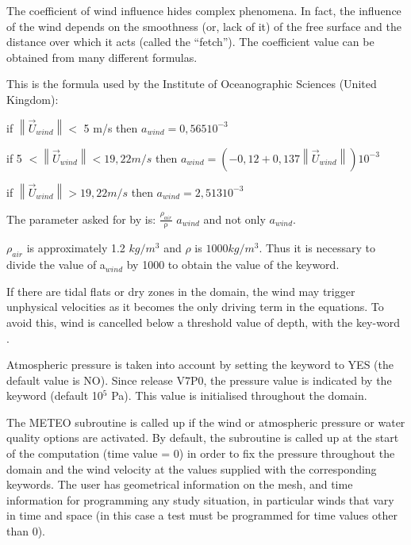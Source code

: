  The coefficient of wind influence hides complex phenomena. In fact, the influence of the wind depends on the smoothness (or, lack of it) of the free surface and the distance over which it acts (called the ``fetch''). The coefficient value can be obtained from many different formulas.

 This is the formula used by the Institute of Oceanographic Sciences (United Kingdom):



 if    $\left \|\vec{U}_{wind} \right \| <$ 5 m/s   then   $a_{wind}  = 0,565 10^{-3}$

 if  5   $< \left \| \vec{U}_{wind}  \right \| < 19,22 m/s$ then    $a_{wind} = (- 0,12 + 0,137 \left \| \vec{U}_{wind}   \right \|) 10^{-3}$

 if    $\left \| \vec{U}_{wind}  \right \|   > 19,22 m/s $  then     $a_{wind} = 2,513 10^{-3}$

 The parameter  asked for by  is: $\frac{{\rho }_{air}}{\mathrm{\rho }}$ $a_{wind}$ and not only $a_{wind}$.

 $\rho_{air}$ is approximately 1.2 $kg/m^3$ and $\rho$ is $1000 kg/m^3$. Thus it is necessary to divide the value of a${}_{wind}$ by 1000 to obtain the value of the  keyword.

 If there are tidal flats or dry zones in the domain, the wind may trigger unphysical velocities as it becomes the only driving term in the equations. To avoid this, wind is cancelled below a threshold value of depth, with the key-word .

 Atmospheric pressure is taken into account by setting the keyword  to YES (the default value is NO). Since release V7P0, the pressure value is indicated by the keyword  (default 10${}^{5}$ Pa). This value is initialised throughout the domain.

 The METEO subroutine is called up if the wind or atmospheric pressure or water quality options are activated. By default, the subroutine is called up at the start of the computation (time value = 0) in order to fix the pressure throughout the domain and the wind velocity at the values supplied with the corresponding keywords. The user has geometrical information on the mesh, and time information for programming any study situation, in particular winds that vary in time and space (in this case a test must be programmed for time values other than 0).


